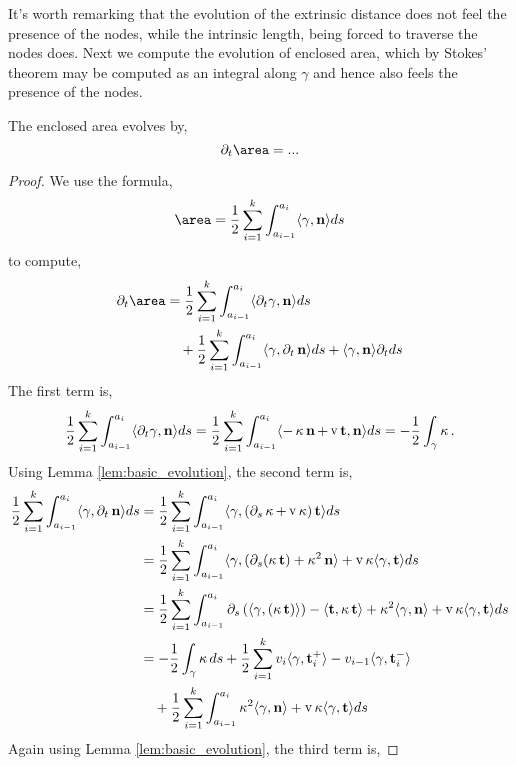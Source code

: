 \documentclass[11pt]{amsart}
\DeclareMathOperator{\tangspeed}{v}
\begin{document}
It's worth remarking that the evolution of the extrinsic distance does not feel the presence of the nodes, while the intrinsic length, being forced to traverse the nodes does. Next we compute the evolution of enclosed area, which by Stokes' theorem may be computed as an integral along \(\gamma\) and hence also feels the presence of the nodes.

\begin{lemma}
The enclosed area evolves by,
\[
\partial_t \area = ...
\]
\end{lemma}

\begin{proof}
We use the formula,
\[
\area = \frac{1}{2} \sum_{i=1}^k \int_{a_{i-1}}^{a_i} \ip{\gamma}{\nor} ds
\]
to compute,
\[
\begin{split}
\partial_t \area &= \frac{1}{2} \sum_{i=1}^k \int_{a_{i-1}}^{a_i} \ip{\partial_t \gamma}{\nor} ds \\
&\quad + \frac{1}{2} \sum_{i=1}^k \int_{a_{i-1}}^{a_i} \ip{\gamma}{\partial_t \nor} ds + \ip{\gamma}{\nor} \partial_t ds
\end{split}
\]
The first term is,
\[
\frac{1}{2} \sum_{i=1}^k \int_{a_{i-1}}^{a_i} \ip{\partial_t \gamma}{\nor} ds = \frac{1}{2} \sum_{i=1}^k \int_{a_{i-1}}^{a_i} \ip{-\curvecurv \nor + \tangspeed \tang}{\nor} ds = -\frac{1}{2} \int_{\gamma} \curvecurv.
\]
Using Lemma \ref{lem:basic_evolution}, the second term is,
\[
\begin{split}
\frac{1}{2} \sum_{i=1}^k \int_{a_{i-1}}^{a_i} \ip{\gamma}{\partial_t \nor} ds &= \frac{1}{2} \sum_{i=1}^k \int_{a_{i-1}}^{a_i} \ip{\gamma}{(\partial_s \curvecurv + \tangspeed \curvecurv)\tang } ds \\
&= \frac{1}{2} \sum_{i=1}^k \int_{a_{i-1}}^{a_i} \ip{\gamma}{(\partial_s (\curvecurv \tang) + \curvecurv^2 \nor} + \tangspeed \curvecurv \ip{\gamma}{\tang } ds \\
&= \frac{1}{2} \sum_{i=1}^k \int_{a_{i-1}}^{a_i} \partial_s \left(\ip{\gamma}{(\curvecurv \tang)}\right) - \ip{\tang}{\curvecurv\tang} + \curvecurv^2 \ip{\gamma}{\nor} + \tangspeed \curvecurv \ip{\gamma}{\tang } ds \\
&= -\frac{1}{2} \int_{\gamma} \curvecurv ds + \frac{1}{2} \sum_{i=1}^k v_i \ip{\gamma}{\tang_i^+} - v_{i-1} \ip{\gamma}{\tang_i^-} \\
&\quad + \frac{1}{2} \sum_{i=1}^k \int_{a_{i-1}}^{a_i} \curvecurv^2 \ip{\gamma}{\nor} + \tangspeed \curvecurv \ip{\gamma}{\tang } ds
\end{split}
\]
Again using Lemma \ref{lem:basic_evolution}, the third term is,

\end{proof}
\end{document}
